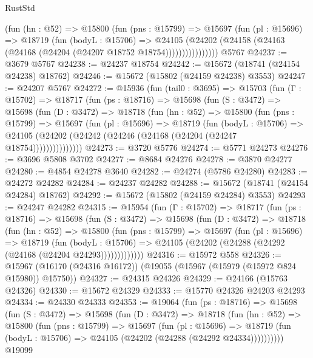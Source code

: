 \begin{lexlean}{RustStd}
\begin{coremodule}
                (fun (hn : @52) =>
                @15800
                  (fun (pns : @15799) =>
                  @15697
                    (fun (pl : @15696) =>
                    @18719
                      (fun (bodyL : @15706) =>
                      @24105
                        (@24202
                          (@24158 (@24163 (@24168 (@24204 (@24207 @18752 @18754))))))))))))))))
    @5767
@24237 := @3679 @5767
@24238 := @24237 @18754
@24242 := @15672 (@18741 (@24154 @24238) @18762)
@24246 := @15672 (@15802 (@24159 @24238) @3553)
@24247 := @24207 @5767
@24272 := @15936
    (fun (tail0 : @3695) =>
    @15703
      (fun (Γ : @15702) =>
      @18717
        (fun (ps : @18716) =>
        @15698
          (fun (S : @3472) =>
          @15698
            (fun (D : @3472) =>
            @18718
              (fun (hn : @52) =>
              @15800
                (fun (pns : @15799) =>
                @15697
                  (fun (pl : @15696) =>
                  @18719
                    (fun (bodyL : @15706) =>
                    @24105 (@24202 (@24242 (@24246 (@24168 (@24204 (@24247 @18754)))))))))))))))
@24273 := @3720 @5776
@24274 := @5771 @24273
@24276 := @3696 @5808 @3702
@24277 := @8684 @24276
@24278 := @3870 @24277
@24280 := @4854 @24278 @3640
@24282 := @24274 (@5786 @24280)
@24283 := @24272 @24282
@24284 := @24237 @24282
@24288 := @15672 (@18741 (@24154 @24284) @18762)
@24292 := @15672 (@15802 (@24159 @24284) @3553)
@24293 := @24247 @24282
@24315 := @15954
    (fun (Γ : @15702) =>
    @18717
      (fun (ps : @18716) =>
      @15698
        (fun (S : @3472) =>
        @15698
          (fun (D : @3472) =>
          @18718
            (fun (hn : @52) =>
            @15800
              (fun (pns : @15799) =>
              @15697
                (fun (pl : @15696) =>
                @18719
                  (fun (bodyL : @15706) =>
                  @24105 (@24202 (@24288 (@24292 (@24168 (@24204 @24293)))))))))))))
@24316 := @15972 @558
@24326 := @15967 (@16170 (@24316 @16172)) (@19055 (@15967 (@15979 (@15972 @824 @15980)) @15750))
@24327 := @24315 @24326
@24329 := @24166 (@15763 @24326)
@24330 := @15672 @24329
@24333 := @15770 @24326 @24203 @24293
@24334 := @24330 @24333
@24353 := @19064
    (fun (ps : @18716) =>
    @15698
      (fun (S : @3472) =>
      @15698
        (fun (D : @3472) =>
        @18718
          (fun (hn : @52) =>
          @15800
            (fun (pns : @15799) =>
            @15697
              (fun (pl : @15696) =>
              @18719 (fun (bodyL : @15706) => @24105 (@24202 (@24288 (@24292 @24334))))))))))
    @19099

\end{coremodule}
\end{lexlean}
